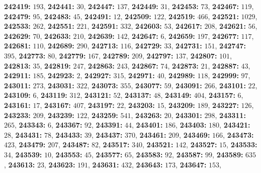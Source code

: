 \textsf{\bfseries 242419:} $193$, \textsf{\bfseries 242441:} $30$, \textsf{\bfseries 242447:} $137$, \textsf{\bfseries 242449:} $31$, \textsf{\bfseries 242453:} $73$, \textsf{\bfseries 242467:} $119$, \textsf{\bfseries 242479:} $95$, \textsf{\bfseries 242483:} $45$, \textsf{\bfseries 242491:} $12$, \textsf{\bfseries 242509:} $122$, \textsf{\bfseries 242519:} $466$, \textsf{\bfseries 242521:} $1029$, \textsf{\bfseries 242533:} $262$, \textsf{\bfseries 242551:} $221$, \textsf{\bfseries 242591:} $332$, \textsf{\bfseries 242603:} $53$, \textsf{\bfseries 242617:} $208$, \textsf{\bfseries 242621:} $56$, \textsf{\bfseries 242629:} $70$, \textsf{\bfseries 242633:} $210$, \textsf{\bfseries 242639:} $142$, \textsf{\bfseries 242647:} $6$, \textsf{\bfseries 242659:} $197$, \textsf{\bfseries 242677:} $117$, \textsf{\bfseries 242681:} $110$, \textsf{\bfseries 242689:} $290$, \textsf{\bfseries 242713:} $116$, \textsf{\bfseries 242729:} $33$, \textsf{\bfseries 242731:} $151$, \textsf{\bfseries 242747:} $395$, \textsf{\bfseries 242773:} $80$, \textsf{\bfseries 242779:} $167$, \textsf{\bfseries 242789:} $209$, \textsf{\bfseries 242797:} $137$, \textsf{\bfseries 242807:} $101$, \textsf{\bfseries 242813:} $35$, \textsf{\bfseries 242819:} $247$, \textsf{\bfseries 242863:} $243$, \textsf{\bfseries 242867:} $74$, \textsf{\bfseries 242873:} $21$, \textsf{\bfseries 242887:} $43$, \textsf{\bfseries 242911:} $185$, \textsf{\bfseries 242923:} $2$, \textsf{\bfseries 242927:} $315$, \textsf{\bfseries 242971:} $40$, \textsf{\bfseries 242989:} $118$, \textsf{\bfseries 242999:} $97$, \textsf{\bfseries 243011:} $273$, \textsf{\bfseries 243031:} $322$, \textsf{\bfseries 243073:} $355$, \textsf{\bfseries 243077:} $59$, \textsf{\bfseries 243091:} $266$, \textsf{\bfseries 243101:} $22$, \textsf{\bfseries 243109:} $6$, \textsf{\bfseries 243119:} $312$, \textsf{\bfseries 243121:} $52$, \textsf{\bfseries 243137:} $48$, \textsf{\bfseries 243149:} $404$, \textsf{\bfseries 243157:} $6$, \textsf{\bfseries 243161:} $17$, \textsf{\bfseries 243167:} $407$, \textsf{\bfseries 243197:} $22$, \textsf{\bfseries 243203:} $15$, \textsf{\bfseries 243209:} $189$, \textsf{\bfseries 243227:} $126$, \textsf{\bfseries 243233:} $209$, \textsf{\bfseries 243239:} $122$, \textsf{\bfseries 243259:} $541$, \textsf{\bfseries 243263:} $20$, \textsf{\bfseries 243301:} $298$, \textsf{\bfseries 243311:} $265$, \textsf{\bfseries 243343:} $6$, \textsf{\bfseries 243367:} $92$, \textsf{\bfseries 243391:} $44$, \textsf{\bfseries 243401:} $186$, \textsf{\bfseries 243403:} $180$, \textsf{\bfseries 243421:} $28$, \textsf{\bfseries 243431:} $78$, \textsf{\bfseries 243433:} $39$, \textsf{\bfseries 243437:} $370$, \textsf{\bfseries 243461:} $209$, \textsf{\bfseries 243469:} $166$, \textsf{\bfseries 243473:} $423$, \textsf{\bfseries 243479:} $207$, \textsf{\bfseries 243487:} $82$, \textsf{\bfseries 243517:} $340$, \textsf{\bfseries 243521:} $142$, \textsf{\bfseries 243527:} $15$, \textsf{\bfseries 243533:} $34$, \textsf{\bfseries 243539:} $10$, \textsf{\bfseries 243553:} $45$, \textsf{\bfseries 243577:} $65$, \textsf{\bfseries 243583:} $92$, \textsf{\bfseries 243587:} $99$, \textsf{\bfseries 243589:} $635$, \textsf{\bfseries 243613:} $23$, \textsf{\bfseries 243623:} $191$, \textsf{\bfseries 243631:} $432$, \textsf{\bfseries 243643:} $173$, \textsf{\bfseries 243647:} $153$, 

